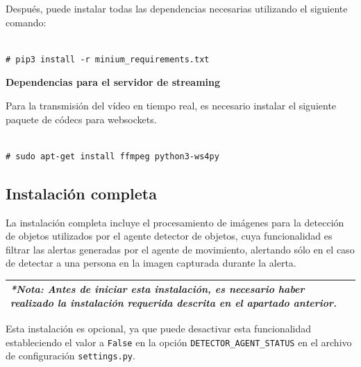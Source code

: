 \vspace{-1.4cm}

Después, puede instalar todas las dependencias necesarias utilizando el siguiente comando:

\vspace{-1.4cm}

\begin{verbatim}

# pip3 install -r minium_requirements.txt

\end{verbatim}

\vspace{-1.4cm}

\textbf{Dependencias para el servidor de streaming}

Para la transmisión del vídeo en tiempo real, es necesario instalar el siguiente paquete de códecs para websockets.

\vspace{-1.4cm}

\begin{verbatim}

# sudo apt-get install ffmpeg python3-ws4py

\end{verbatim}

\vspace{-1.4cm}

\newpage

\subsection{Instalación completa}

La instalación completa incluye el procesamiento de imágenes para la detección de objetos utilizados por el agente detector de objetos, cuya funcionalidad es filtrar las alertas generadas por el agente de movimiento, alertando sólo en el caso de detectar a una persona en la imagen capturada durante la alerta.


\begin{tabular}{|p{15.5cm}|}
	
	\hline
	
	\textit{ \textbf{*Nota:} Antes de iniciar esta instalación, es necesario haber realizado la instalación requerida descrita en el apartado anterior. }
	\\
	\hline
	
\end{tabular}

Esta instalación es opcional, ya que puede desactivar esta funcionalidad estableciendo el valor a \texttt{False} en la opción \texttt{DETECTOR\_AGENT\_STATUS} en el archivo de configuración \texttt{settings.py}.

